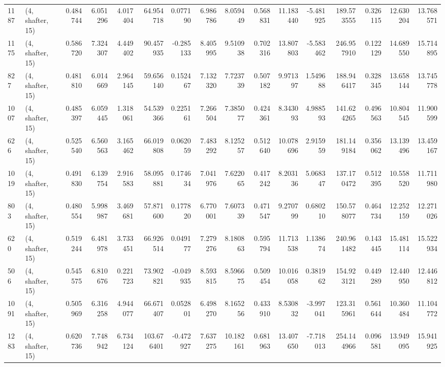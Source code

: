 \begin{tabular}{llrrrrrrrrrrrrrr}
1187 &  (4, shafter, 15) &   0.484744 &   6.051296 &   4.017404 &     64.954718 &    0.077190 &    6.986786 &    8.059449 &  0.568831 &  11.183440 &  -5.481925 &   189.573555 &   0.326115 &  12.630204 &  13.768571 \\
1175 &  (4, shafter, 15) &   0.586720 &   7.324307 &   4.449402 &     90.457935 &   -0.285133 &    8.405995 &    9.510938 &  0.702316 &  13.807803 &  -5.583462 &   246.957910 &   0.122129 &  14.689550 &  15.714895 \\
827  &  (4, shafter, 15) &   0.481810 &   6.014669 &   2.964145 &     59.656140 &    0.152467 &    7.132320 &    7.723739 &  0.507182 &   9.971397 &   1.549688 &   188.946417 &   0.328345 &  13.658144 &  13.745778 \\
1007 &  (4, shafter, 15) &   0.485397 &   6.059445 &   1.318061 &     54.539366 &    0.225161 &    7.266504 &    7.385077 &  0.424361 &   8.343093 &   4.988593 &   141.624265 &   0.496563 &  10.804545 &  11.900599 \\
626  &  (4, shafter, 15) &   0.525540 &   6.560563 &   3.165462 &     66.019808 &    0.062059 &    7.483292 &    8.125257 &  0.512640 &  10.078696 &   2.915959 &   181.149184 &   0.356062 &  13.139496 &  13.459167 \\
1019 &  (4, shafter, 15) &   0.491830 &   6.139754 &   2.916583 &     58.095881 &    0.174634 &    7.041976 &    7.622065 &  0.417242 &   8.203136 &   5.068347 &   137.170472 &   0.512395 &  10.558520 &  11.711980 \\
803  &  (4, shafter, 15) &   0.480554 &   5.998987 &   3.469681 &     57.871600 &    0.177820 &    6.770001 &    7.607339 &  0.471547 &   9.270799 &   0.680210 &   150.578077 &   0.464734 &  12.252159 &  12.271026 \\
620  &  (4, shafter, 15) &   0.519244 &   6.481978 &   3.733451 &     66.926514 &    0.049177 &    7.279276 &    8.180863 &  0.595794 &  11.713538 &   1.138674 &   240.961482 &   0.143445 &  15.481114 &  15.522934 \\
506  &  (4, shafter, 15) &   0.545575 &   6.810676 &   0.221723 &     73.902821 &   -0.049935 &    8.593815 &    8.596675 &  0.509454 &  10.016058 &   0.381962 &   154.923121 &   0.449289 &  12.440950 &  12.446812 \\
1091 &  (4, shafter, 15) &   0.505969 &   6.316258 &   4.944077 &     66.671407 &    0.052801 &    6.498270 &    8.165256 &  0.433910 &   8.530832 &  -3.997041 &   123.315961 &   0.561644 &  10.360484 &  11.104772 \\
1283 &  (4, shafter, 15) &   0.620736 &   7.748942 &   6.734124 &    103.676401 &   -0.472927 &    7.637275 &   10.182161 &  0.681963 &  13.407650 &  -7.718013 &   254.144966 &   0.096581 &  13.949095 &  15.941925 \\

\end{tabular}
